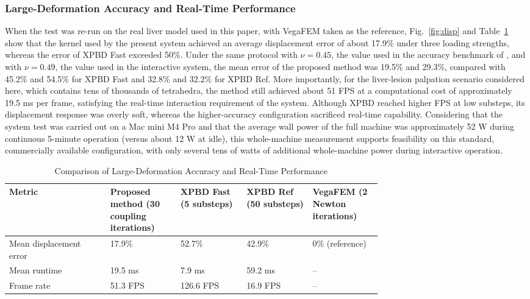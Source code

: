 \documentclass{ieeeaccess}
\begin{document}
\subsubsection{Large-Deformation Accuracy and Real-Time Performance}
When the test was re-run on the real liver model used in this paper, with VegaFEM taken as the reference, Fig.~\ref{fig:disp} and Table~\ref{tab:disp} show that the kernel used by the present system achieved an average displacement error of about 17.9\% under three loading strengths, whereas the error of XPBD Fast exceeded 50\%. Under the same protocol with $\nu=0.45$, the value used in the accuracy benchmark of \cite{wang2025group}, and with $\nu=0.49$, the value used in the interactive system, the mean error of the proposed method was 19.5\% and 29.3\%, compared with 45.2\% and 54.5\% for XPBD Fast and 32.8\% and 32.2\% for XPBD Ref. More importantly, for the liver-lesion palpation scenario considered here, which contains tens of thousands of tetrahedra, the method still achieved about 51 FPS at a computational cost of approximately 19.5 ms per frame, satisfying the real-time interaction requirement of the system. Although XPBD reached higher FPS at low substeps, its displacement response was overly soft, whereas the higher-accuracy configuration sacrificed real-time capability. Considering that the system test was carried out on a Mac mini M4 Pro and that the average wall power of the full machine was approximately 52 W during continuous 5-minute operation (versus about 12 W at idle), this whole-machine measurement supports feasibility on this standard, commercially available configuration, with only several tens of watts of additional whole-machine power during interactive operation.

\begin{table}[htbp]
\caption{Comparison of Large-Deformation Accuracy and Real-Time Performance}
\label{tab:disp}
\centering
\scriptsize
\renewcommand{\arraystretch}{1.15}
\setlength{\tabcolsep}{4pt}
\begin{tabular}{|p{0.20\linewidth}|p{0.13\linewidth}|p{0.13\linewidth}|p{0.13\linewidth}|p{0.12\linewidth}|}
\hline
Metric & Proposed method (30 coupling iterations) & XPBD Fast (5 substeps) & XPBD Ref (50 substeps) & VegaFEM (2 Newton iterations) \\
\hline
Mean displacement error & 17.9\% & 52.7\% & 42.9\% & 0\% (reference) \\
\hline
Mean runtime & 19.5 ms & 7.9 ms & 59.2 ms & -- \\
\hline
Frame rate & 51.3 FPS & 126.6 FPS & 16.9 FPS & -- \\
\hline
\end{tabular}
\end{table}
\end{document}
